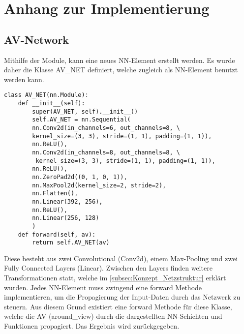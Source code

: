 \chapter{Anhang zur Implementierung}

\section{AV-Network} \label{sec:Anhang_AV_Network}
Mithilfe der Module, kann eine neues NN-Element erstellt werden.
Es wurde daher die Klasse AV\_NET definiert, welche zugleich als NN-Element benutzt werden kann.
\begin{lstlisting}[caption=Implementierung des AV-NET, style=Python]
class AV_NET(nn.Module):
	def __init__(self):
		super(AV_NET, self).__init__()
		self.AV_NET = nn.Sequential(
		nn.Conv2d(in_channels=6, out_channels=8, \
		kernel_size=(3, 3), stride=(1, 1), padding=(1, 1)),
		nn.ReLU(),
		nn.Conv2d(in_channels=8, out_channels=8, \
		 kernel_size=(3, 3), stride=(1, 1), padding=(1, 1)),
		nn.ReLU(),
		nn.ZeroPad2d((0, 1, 0, 1)),
		nn.MaxPool2d(kernel_size=2, stride=2),
		nn.Flatten(),
		nn.Linear(392, 256),
		nn.ReLU(),
		nn.Linear(256, 128)
		)
	def forward(self, av):
		return self.AV_NET(av)
\end{lstlisting}
Diese besteht aus zwei Convolutional (Conv2d), einem Max-Pooling und zwei Fully Connected Layers (Linear). 
Zwischen den Layers finden weitere Transformationen statt, welche im \autoref{subsec:Konzept_Netzstruktur} erklärt wurden.
Jedes NN-Element muss zwingend eine forward Methode implementieren, um die Propagierung der Input-Daten durch das Netzwerk zu steuern. Aus diesem Grund existiert eine forward Methode für diese Klasse, welche die AV (around\_view) durch die dargestellten NN-Schichten und Funktionen propagiert. Das Ergebnis wird zurückgegeben.

